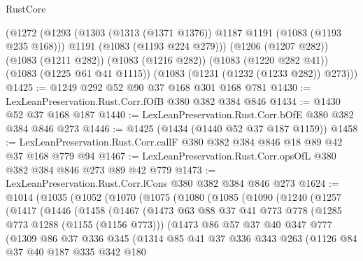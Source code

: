 \begin{lexlean}{RustCore}
\begin{coremodule}
    (@1272
      (@1293
        (@1303 (@1313 (@1371 @1376)) @1187 @1191 (@1083 (@1193 @235 @168)))
        @1191
        (@1083 (@1193 @224 @279)))
      (@1206 (@1207 @282))
      (@1083 (@1211 @282))
      (@1083 (@1216 @282))
      (@1083 (@1220 @282 @41))
      (@1083 (@1225 @61 @41 @1115))
      (@1083 (@1231 (@1232 (@1233 @282)) @273)))
@1425 := @1249 @292 @52 @90 @37 @168 @301 @168 @781
@1430 := LexLeanPreservation.Rust.Corr.fOfB @380 @382 @384 @846
@1434 := @1430 @52 @37 @168 @187
@1440 := LexLeanPreservation.Rust.Corr.bOfE @380 @382 @384 @846 @273
@1446 := @1425 (@1434 (@1440 @52 @37 @187 @1159))
@1458 := LexLeanPreservation.Rust.Corr.callF @380 @382 @384 @846 @18 @89 @42 @37 @168 @779 @94
@1467 := LexLeanPreservation.Rust.Corr.opsOfL @380 @382 @384 @846 @273 @89 @42 @779
@1473 := LexLeanPreservation.Rust.Corr.lCons @380 @382 @384 @846 @273
@1624 := @1014
    (@1035
      (@1052
        (@1070
          (@1075
            (@1080
              (@1085
                (@1090
                  (@1240
                    (@1257
                      (@1417
                        (@1446
                          (@1458
                            (@1467
                              (@1473
                                @63
                                @88
                                @37
                                @41
                                @773
                                @778
                                (@1285 @773 @1288 (@1155 (@1156 @773)))
                                (@1473
                                  @86
                                  @57
                                  @37
                                  @40
                                  @347
                                  @777
                                  (@1309
                                    @86
                                    @37
                                    @336
                                    @345
                                    (@1314
                                      @85
                                      @41
                                      @37
                                      @336
                                      @343
                                      @263
                                      (@1126
                                        @84
                                        @37
                                        @40
                                        @187
                                        @335
                                        @342
                                        @180

\end{coremodule}
\end{lexlean}
